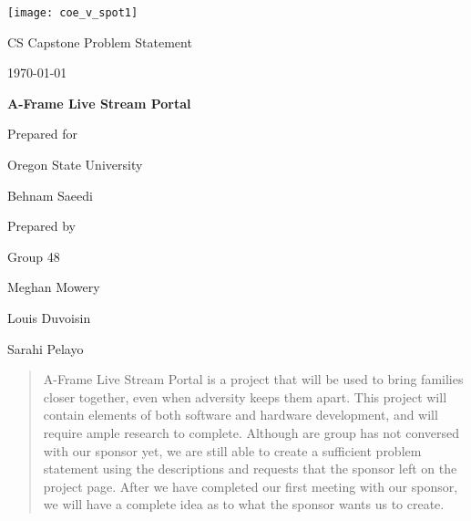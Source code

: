 \documentclass[onecolumn, draftclsnofoot,10pt, compsoc]{IEEEtran}
\def \CapstoneTeamName{		}
\def \CapstoneTeamNumber{		48}
\def \GroupMemberOne{			Meghan Mowery}
\def \GroupMemberTwo{			Louis Duvoisin}
\def \GroupMemberThree{			Sarahi Pelayo}
\def \CapstoneProjectName{		A-Frame Live Stream Portal}
\def \CapstoneSponsorCompany{	Oregon State University}
\def \CapstoneSponsorPerson{		Behnam Saeedi}
\def \DocType{		Problem Statement
				}
\newcommand{\NameSigPair}[1]{\par
\makebox[2.75in][r]{#1} \hfil 	\makebox[3.25in]{\makebox[2.25in]{\hrulefill} \hfill		\makebox[.75in]{\hrulefill}}
\par\vspace{-12pt} \textit{\tiny\noindent
\makebox[2.75in]{} \hfil		\makebox[3.25in]{\makebox[2.25in][r]{Signature} \hfill	\makebox[.75in][r]{Date}}}}
\renewcommand{\NameSigPair}[1]{#1}
\begin{document}
\begin{titlepage}
    \begin{singlespace}
    	\texttt{[image: coe\_v\_spot1]}
        \hfill 
        \par\vspace{.2in}
        \centering
        \scshape{
            \huge CS Capstone \DocType \par
            {\large\today}\par
            \vspace{.5in}
            \textbf{\Huge\CapstoneProjectName}\par
            \vfill
            {\large Prepared for}\par
            \Huge \CapstoneSponsorCompany\par
            \vspace{5pt}
            {\Large\NameSigPair{\CapstoneSponsorPerson}\par}
            {\large Prepared by }\par
            Group\CapstoneTeamNumber\par
            \CapstoneTeamName\par 
            \vspace{5pt}
            {\Large
                \NameSigPair{\GroupMemberOne}\par
                \NameSigPair{\GroupMemberTwo}\par
                \NameSigPair{\GroupMemberThree}\par
            }
            \vspace{20pt}
        }
        \begin{abstract}
        	A-Frame Live Stream Portal is a project that will be used to bring families closer together, even when adversity keeps them apart. This project will contain elements of both software and hardware development, and will require ample research to complete. Although are group has not conversed with our sponsor yet, we are still able to create a sufficient problem statement using the descriptions and requests that the sponsor left on the project page. After we have completed our first meeting with our sponsor, we will have a complete idea as to what the sponsor wants us to create.
        \end{abstract}     
    \end{singlespace}
\end{titlepage}
\newpage
{}
\tableofcontents
\clearpage
\end{document}
